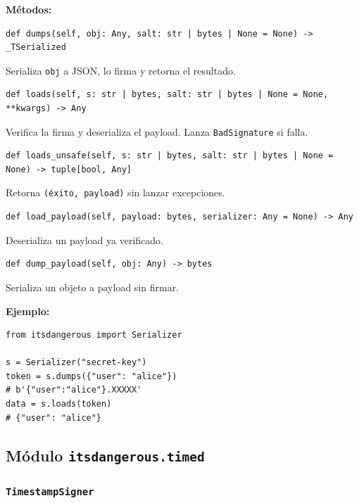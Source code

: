 \documentclass[11pt,a4paper]{article}
\begin{document}
\textbf{Métodos:}


\begin{lstlisting}
def dumps(self, obj: Any, salt: str | bytes | None = None) -> _TSerialized
\end{lstlisting}


Serializa \texttt{obj} a JSON, lo firma y retorna el resultado.


\begin{lstlisting}
def loads(self, s: str | bytes, salt: str | bytes | None = None, **kwargs) -> Any
\end{lstlisting}


Verifica la firma y deserializa el payload. Lanza \texttt{BadSignature} si falla.


\begin{lstlisting}
def loads_unsafe(self, s: str | bytes, salt: str | bytes | None = None) -> tuple[bool, Any]
\end{lstlisting}


Retorna \texttt{(éxito, payload)} sin lanzar excepciones.


\begin{lstlisting}
def load_payload(self, payload: bytes, serializer: Any = None) -> Any
\end{lstlisting}


Deserializa un payload ya verificado.


\begin{lstlisting}
def dump_payload(self, obj: Any) -> bytes
\end{lstlisting}


Serializa un objeto a payload sin firmar.


\textbf{Ejemplo:}


\begin{lstlisting}
from itsdangerous import Serializer

s = Serializer("secret-key")
token = s.dumps({"user": "alice"})
# b'{"user":"alice"}.XXXXX'
data = s.loads(token)
# {"user": "alice"}
\end{lstlisting}


\subsection*{Módulo \texttt{itsdangerous.timed}}


\subsubsection*{\texttt{TimestampSigner}}
\end{document}
